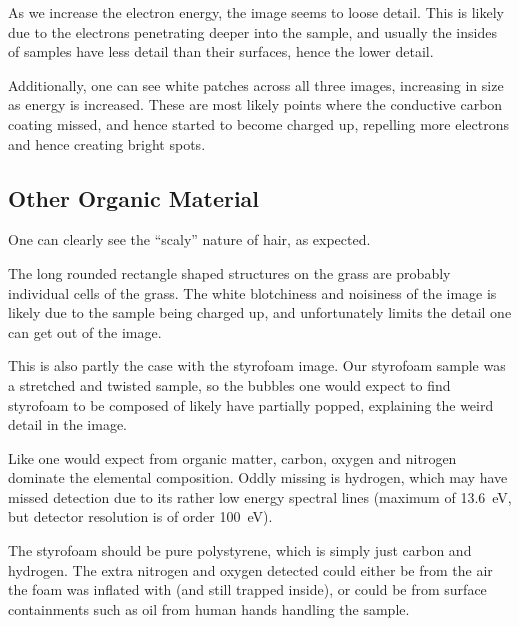 \documentclass[a4paper]{scrartcl}
\begin{document}
As we increase the electron energy, the image seems to loose detail. This is likely due to the electrons penetrating deeper into the sample, and usually the insides of samples have less detail than their surfaces, hence the lower detail.

Additionally, one can see white patches across all three images, increasing in size as energy is increased. These are most likely points where the conductive carbon coating missed, and hence started to become charged up, repelling more electrons and hence creating bright spots.

\subsection{Other Organic Material}
One can clearly see the ``scaly'' nature of hair, as expected.

The long rounded rectangle shaped structures on the grass are probably individual cells of the grass. The white blotchiness and noisiness of the image is likely due to the sample being charged up, and unfortunately limits the detail one can get out of the image.

This is also partly the case with the styrofoam image. Our styrofoam sample was a stretched and twisted sample, so the bubbles one would expect to find styrofoam to be composed of likely have partially popped, explaining the weird detail in the image.

Like one would expect from organic matter, carbon, oxygen and nitrogen dominate the elemental composition. Oddly missing is hydrogen, which may have missed detection due to its rather low energy spectral lines (maximum of \SI{13.6}{\electronvolt}, but detector resolution is of order \SI{100}{\electronvolt}).

The styrofoam should be pure polystyrene, which is simply just carbon and hydrogen. The extra nitrogen and oxygen detected could either be from the air the foam was inflated with (and still trapped inside), or could be from surface containments such as oil from human hands handling the sample.
\end{document}
